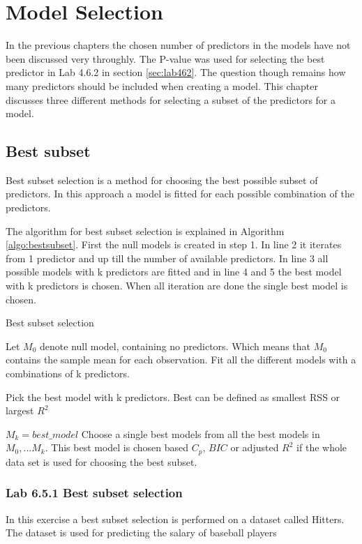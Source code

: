 \chapter{Model Selection}
\label{chp:subsel}

In the previous chapters the chosen number of predictors in the models have not been discussed very throughly. The P-value was used for selecting the best predictor in Lab 4.6.2 in section \ref{sec:lab462}. The question though remains how many predictors should be included when creating a model. This chapter discusses three different methods for selecting a subset of the predictors for a model.

\section{Best subset}
Best subset selection is a method for choosing the best possible subset of predictors. In this approach a model is fitted for each possible combination of the predictors.

The algorithm for best subset selection is explained in Algorithm \ref{algo:bestsubset}. First the null models is created in step 1. In line 2 it iterates from 1 predictor and up till the number of available predictors. In line 3 all possible models with k predictors are fitted and in line 4 and 5 the best model with k predictors is chosen. When all iteration are done the single best model is chosen.

\begin{algorithm}
	\caption{Best subset selection}
	\label{algo:bestsubset}
	\begin{algorithmic}[1]
		\State Let $M_0$ denote null model, containing no predictors. Which means that $M_0$ contains the sample mean for each observation.
		\State Fit all the different models with a combinations of k predictors.
		\State \parbox[t]{\dimexpr\linewidth-\algorithmicindent}{Pick the best model with k predictors. Best can be defined as smallest RSS or largest $R^2$}
		\State $M_k = best\_model$
		\EndFor
		\State Choose a single best models from all the best models in $M_0,...M_k$. This best model is chosen based $C_p$, $BIC$ or adjusted $R^2$ if the whole data set is used for choosing the best subset.
	\end{algorithmic}
\end{algorithm}


\subsection{Lab 6.5.1 Best subset selection}
In this exercise a best subset selection is performed on a dataset called Hitters. The dataset is used for predicting the salary of baseball players

